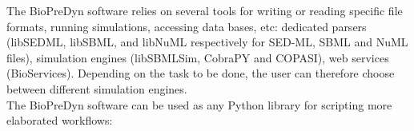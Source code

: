 \documentclass{llncs}
\begin{document}
The BioPreDyn software relies on several tools for writing or reading specific
file formats, running simulations, accessing data bases, etc: dedicated parsers
(libSEDML, libSBML, and libNuML respectively for SED-ML, SBML and NuML files),
simulation engines (libSBMLSim\cite{Takizawa2013}, CobraPY\cite{Ebrahim2013}
and COPASI\cite{Hoops2006}), web services (BioServices\cite{Cokelaer2013}).
Depending on the task to be done, the user can therefore choose between
different simulation engines.\\

The BioPreDyn software can be used as any Python library for scripting more
elaborated workflows:

{}

\end{document}
